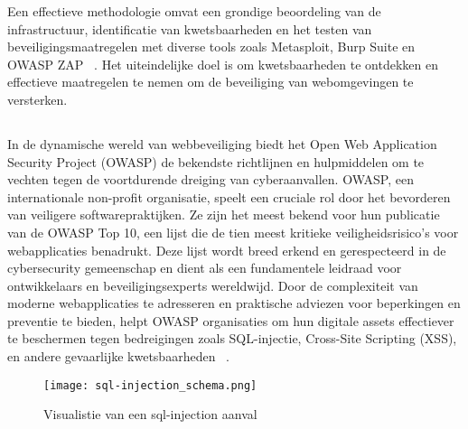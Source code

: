 Een effectieve methodologie omvat een grondige beoordeling van de infrastructuur, identificatie van kwetsbaarheden en het 
testen van beveiligingsmaatregelen met diverse tools zoals Metasploit, Burp Suite en OWASP ZAP ~\autocite{Ravindran2022}. 
Het uiteindelijke doel is om kwetsbaarheden te ontdekken en effectieve maatregelen te nemen om de beveiliging van webomgevingen 
te versterken.

\subsection{}
\label{sec:Veiligheidskwetsbaarheden in Webomgevingen}
In de dynamische wereld van webbeveiliging biedt het Open Web Application Security Project (OWASP) de bekendste richtlijnen en hulpmiddelen om te vechten 
tegen de voortdurende dreiging van cyberaanvallen. OWASP, een internationale non-profit organisatie, speelt een cruciale rol door het bevorderen van 
veiligere softwarepraktijken. Ze zijn het meest bekend voor hun publicatie van de OWASP Top 10, een lijst die de tien meest kritieke veiligheidsrisico's 
voor webapplicaties benadrukt. Deze lijst wordt breed erkend en gerespecteerd in de cybersecurity gemeenschap en dient als een fundamentele leidraad 
voor ontwikkelaars en beveiligingsexperts wereldwijd. Door de complexiteit van moderne webapplicaties te adresseren en praktische adviezen voor 
beperkingen en preventie te bieden, helpt OWASP organisaties om hun digitale assets effectiever te beschermen tegen bedreigingen zoals SQL-injectie, 
Cross-Site Scripting (XSS), en andere gevaarlijke kwetsbaarheden ~\autocite{Priyawati2022}.
\begin{figure}
    \centering
    \texttt{[image: sql-injection\_schema.png]}
    \caption[Visualisatie van een sql-injection aanval]{Visualistie van een sql-injection aanval}
\end{figure}
\subsubsection{}
\label{sec:SQL-injectie}

